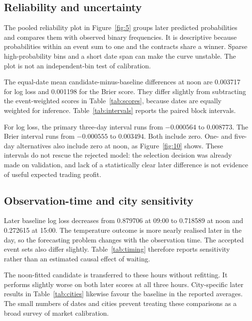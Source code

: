 \subsection{Reliability and uncertainty}
The pooled reliability plot in Figure~\ref{fig:5} groups later predicted probabilities and compares them with observed binary frequencies. It is descriptive because probabilities within an event sum to one and the contracts share a winner. Sparse high-probability bins and a short date span can make the curve unstable. The plot is not an independent-bin test of calibration.


The equal-date mean candidate-minus-baseline differences at noon are 0.003717 for log loss and 0.001198 for the Brier score. They differ slightly from subtracting the event-weighted scores in Table~\ref{tab:scores}, because dates are equally weighted for inference. Table~\ref{tab:intervals} reports the paired block intervals.


For log loss, the primary three-day interval runs from $-0.000564$ to $0.008773$. The Brier interval runs from $-0.000555$ to $0.003494$. Both include zero. One- and five-day alternatives also include zero at noon, as Figure~\ref{fig:10} shows. These intervals do not rescue the rejected model: the selection decision was already made on validation, and lack of a statistically clear later difference is not evidence of useful expected trading profit.


\subsection{Observation-time and city sensitivity}
Later baseline log loss decreases from 0.879706 at 09:00 to 0.718589 at noon and 0.272615 at 15:00. The temperature outcome is more nearly realised later in the day, so the forecasting problem changes with the observation time. The accepted event sets also differ slightly. Table~\ref{tab:timing} therefore reports sensitivity rather than an estimated causal effect of waiting.


The noon-fitted candidate is transferred to these hours without refitting. It performs slightly worse on both later scores at all three hours. City-specific later results in Table~\ref{tab:cities} likewise favour the baseline in the reported averages. The small numbers of dates and cities prevent treating these comparisons as a broad survey of market calibration.

